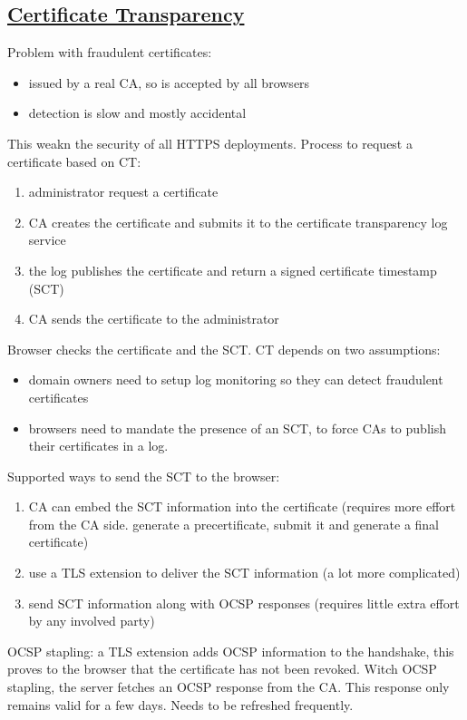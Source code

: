 \documentclass[titlepage]{article}
\begin{document}
    \subsection{\href{https://youtu.be/8yM9wvSj3N8}{Certificate Transparency}}
    Problem with fraudulent certificates:
    \begin{itemize}
        \item issued by a real CA, so is accepted by all browsers
        \item detection is slow and mostly accidental
    \end{itemize}
    This weakn the security of all HTTPS deployments.
    Process to request a certificate based on CT:
    \begin{enumerate}
        \item administrator request a certificate
        \item CA creates the certificate and submits it to the certificate transparency log service
        \item the log publishes the certificate and return a signed certificate timestamp (SCT)
        \item CA sends the certificate to the administrator
    \end{enumerate}
    Browser checks the certificate and the SCT.
    CT depends on two assumptions: 
    \begin{itemize}
        \item domain owners need to setup log monitoring so they can detect fraudulent certificates
        \item browsers need to mandate the presence of an SCT, to force CAs to publish their certificates in a log.
    \end{itemize}
    Supported ways to send the SCT to the browser:
    \begin{enumerate}
        \item CA can embed the SCT information into the certificate (requires more effort from the CA side. generate a precertificate, submit it and generate a final certificate)
        \item use a TLS extension to deliver the SCT information (a lot more complicated)
        \item send SCT information along with OCSP responses (requires little extra effort by any involved party)
    \end{enumerate}
    OCSP stapling: a TLS extension adds OCSP information to the handshake, this proves to the browser that the certificate has not been revoked. Witch OCSP stapling, the server fetches an OCSP response from the CA. This response only remains valid for a few days. Needs to be refreshed frequently.
\end{document}
